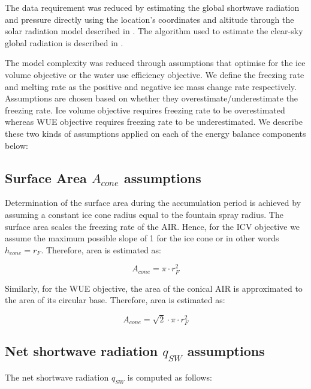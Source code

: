 \documentclass[tc, manuscript]{copernicus}
\begin{document}
The data requirement was reduced by estimating the global shortwave radiation and pressure directly using the
location's coordinates and altitude through the solar radiation model described in
\citet{holmgrenPvlibPythonPython2018}. The algorithm used to estimate the clear-sky global radiation is
described in \citet{ineichenBroadbandSimplifiedVersion2008}.  

The model complexity was reduced through assumptions that optimise for the ice volume objective or the water use
efficiency objective. We define the freezing rate and melting rate as the positive and negative ice mass change
rate respectively. Assumptions are chosen based on whether they overestimate/underestimate the freezing rate.
Ice volume objective requires freezing rate to be overestimated whereas WUE objective requires freezing rate to
be underestimated. We describe these two kinds of assumptions applied on each of the energy balance components
below: 

\subsection{Surface Area $A_{cone}$ assumptions}

Determination of the surface area during the accumulation period is achieved by assuming a constant ice cone
radius equal to the fountain spray radius. The surface area scales the freezing rate of the AIR. Hence, for the
ICV objective we assume the maximum possible slope of 1 for the ice cone or in other words $h_{cone} = r_{F}$.
Therefore, area is estimated as:  

\begin{equation} A_{cone} =\pi \cdot r_{F}^2 \label{eq:Area} \end{equation}

Similarly, for the WUE objective, the area of the conical AIR is approximated to the area of its circular
base. Therefore, area is estimated as:

\begin{equation} A_{cone} =\sqrt{2} \cdot \pi \cdot r_{F}^2 \label{eq:Area} \end{equation}

\subsection{Net shortwave radiation \texorpdfstring{$q_{SW}$}{Lg} assumptions}
\label{sec:SW}

The net shortwave radiation $q_{SW}$ is computed as follows:
\end{document}
